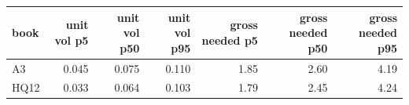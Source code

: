 \begin{tabular}{lrrrrrr}
\toprule
book & unit vol p5 & unit vol p50 & unit vol p95 & gross needed p5 & gross needed p50 & gross needed p95 \\
\midrule
A3 & 0.045 & 0.075 & 0.110 & 1.85 & 2.60 & 4.19 \\
HQ12 & 0.033 & 0.064 & 0.103 & 1.79 & 2.45 & 4.24 \\
\bottomrule
\end{tabular}
